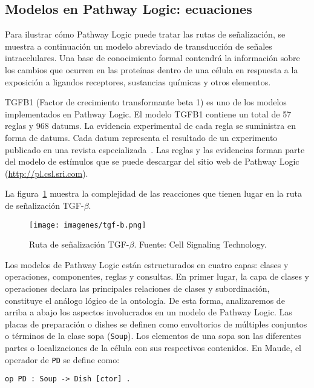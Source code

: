 \subsection{Modelos en Pathway Logic: ecuaciones}
Para ilustrar cómo Pathway Logic puede tratar las rutas de señalización, se muestra a continuación un modelo abreviado de transducción de señales intracelulares.
Una base de conocimiento formal contendrá la información sobre los cambios que ocurren en las proteínas dentro de una célula en respuesta a la exposición a ligandos receptores, sustancias químicas y otros elementos.

TGFB1 (Factor de crecimiento transformante beta 1) es uno de los modelos implementados en Pathway Logic. El modelo TGFB1 contiene un total de 57 reglas y 968 datums. La evidencia experimental de cada regla se suministra en forma de datums. Cada datum representa el resultado de un experimento publicado en una revista especializada~\citep{sfm/Talcott08}. Las reglas y las evidencias forman parte del modelo de estímulos que se puede descargar del sitio web de Pathway Logic (\url{http://pl.csl.sri.com}). 

La figura~\ref{fig:tgf-b} muestra la complejidad de las reacciones que tienen lugar en la ruta de señalización TGF-$\beta$.

\begin{figure}[h!]
\centering
\texttt{[image: imagenes/tgf-b.png]}
\caption[Ruta de señalización TGF-$\beta$]{Ruta de señalización TGF-$\beta$. Fuente: Cell Signaling Technology.}
\label{fig:tgf-b}
\end{figure}

Los modelos de Pathway Logic están estructurados en cuatro capas: clases y operaciones, componentes, reglas y consultas. En primer lugar, la capa de clases y operaciones declara las principales relaciones de clases y subordinación, constituye el análogo lógico de la ontología. De esta forma, analizaremos de arriba a abajo los aspectos involucrados en un modelo de Pathway Logic. Las placas de preparación o dishes se definen como envoltorios de múltiples conjuntos o términos de la clase sopa (\texttt{Soup}). Los elementos de una sopa son las diferentes partes o localizaciones de la célula con sus respectivos contenidos. En Maude, el operador de \texttt{PD} se define como:

\begin{lstlisting}[language=Maude]
  op PD : Soup -> Dish [ctor] .
\end{lstlisting}

